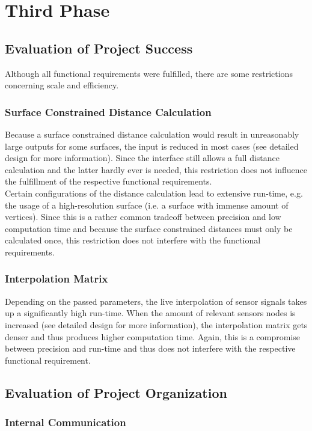 \section{Third Phase}

\subsection{Evaluation of Project Success}
Although all functional requirements were fulfilled, there are some restrictions concerning scale and efficiency.

\subsubsection{Surface Constrained Distance Calculation}
Because a surface constrained distance calculation would result in unreasonably large outputs for some surfaces, the input is reduced in most cases (see detailed design for more information). Since the interface still allows a full distance calculation and the latter hardly ever is needed, this restriction does not influence the fulfillment of the respective functional requirements.\\
Certain configurations of the distance calculation lead to extensive run-time, e.g. the usage of a high-resolution surface (i.e. a surface with immense amount of vertices). Since this is a rather common tradeoff between precision and low computation time and because the surface constrained distances must only be calculated once, this restriction does not interfere with the functional requirements.

\subsubsection{Interpolation Matrix}
Depending on the passed parameters, the live interpolation of sensor signals takes up a significantly high run-time. When the amount of relevant sensors nodes is increased (see detailed design for more information), the interpolation matrix gets denser and thus produces higher computation time. Again, this is a compromise between precision and run-time and thus does not interfere with the respective functional requirement.

\subsection{Evaluation of Project Organization}

\subsubsection{Internal Communication}

